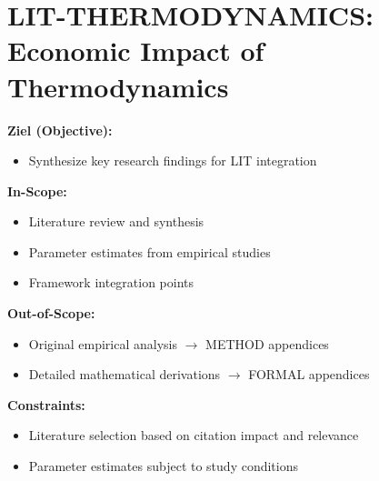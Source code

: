 \chapter{LIT-THERMODYNAMICS: Economic Impact of Thermodynamics}
\label{app:thermodynamics}

\begin{abstract}
This appendix documents how thermodynamics transformed the industrial economy
not by inventing machines, but by enabling plannable, scalable, and comparable
industrial systems. We identify five core economic functions with 25 historical
cases demonstrating each function. The central thesis: thermodynamics created
an \textit{investment, scaling, and comparison logic} that transformed craft
into engineering. The $\gamma$-theory of complementarity aims to provide an
analogous transformation for behavioral economics and AI systems.
\end{abstract}


\begin{tcolorbox}[
    colback=orange!5!white,
    colframe=orange!75!black,
    title={\textbf{Appendix Scope: Ziel / In-Scope / Out-of-Scope / Constraints}},
    fonttitle=\bfseries
]

\textbf{Ziel (Objective):}
\begin{itemize}[nosep]
    \item Synthesize key research findings for LIT integration
\end{itemize}

\textbf{In-Scope:}
\begin{itemize}[nosep]
    \item Literature review and synthesis
    \item Parameter estimates from empirical studies
    \item Framework integration points
\end{itemize}

\textbf{Out-of-Scope:}
\begin{itemize}[nosep]
    \item Original empirical analysis $\rightarrow$ METHOD appendices
    \item Detailed mathematical derivations $\rightarrow$ FORMAL appendices
\end{itemize}

\textbf{Constraints:}
\begin{itemize}[nosep]
    \item Literature selection based on citation impact and relevance
    \item Parameter estimates subject to study conditions
\end{itemize}

\end{tcolorbox}

